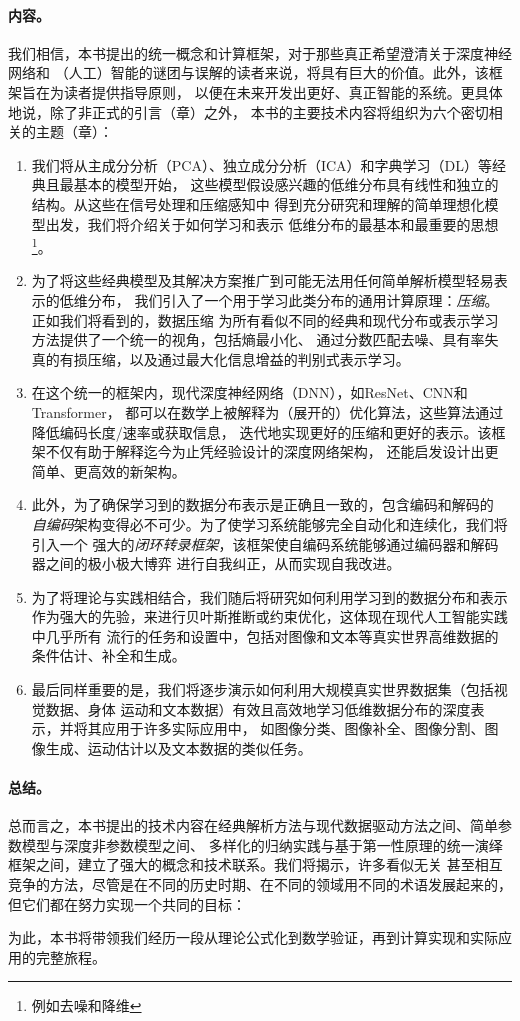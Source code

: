 \documentclass[../../book-main_zh.tex]{subfiles}
\begin{document}
\paragraph{内容。}
我们相信，本书提出的统一概念和计算框架，对于那些真正希望澄清关于深度神经网络和
（人工）智能的谜团与误解的读者来说，将具有巨大的价值。此外，该框架旨在为读者提供指导原则，
以便在未来开发出更好、真正智能的系统。更具体地说，除了非正式的引言（章）之外，
本书的主要技术内容将组织为六个密切相关的主题（章）：
\begin{enumerate}
    \item 我们将从主成分分析（PCA）、独立成分分析（ICA）和字典学习（DL）等经典且最基本的模型开始，
        这些模型假设感兴趣的低维分布具有线性和独立的结构。从这些在信号处理和压缩感知中
        得到充分研究和理解的简单理想化模型出发，我们将介绍关于如何学习和表示
        低维分布的最基本和最重要的思想\footnote{例如去噪和降维}。

    \item 为了将这些经典模型及其解决方案推广到可能无法用任何简单解析模型轻易表示的低维分布，
        我们引入了一个用于学习此类分布的通用计算原理：{\em 压缩}。正如我们将看到的，数据压缩
        为所有看似不同的经典和现代分布或表示学习方法提供了一个统一的视角，包括熵最小化、
        通过分数匹配去噪、具有率失真的有损压缩，以及通过最大化信息增益的判别式表示学习。

    \item 在这个统一的框架内，现代深度神经网络（DNN），如ResNet、CNN和Transformer，
        都可以在数学上被解释为（展开的）优化算法，这些算法通过降低编码长度/速率或获取信息，
        迭代地实现更好的压缩和更好的表示。该框架不仅有助于解释迄今为止凭经验设计的深度网络架构，
        还能启发设计出更简单、更高效的新架构。

    \item 此外，为了确保学习到的数据分布表示是正确且一致的，包含编码和解码的
        {\em 自编码}架构变得必不可少。为了使学习系统能够完全自动化和连续化，我们将引入一个
        强大的{\em 闭环转录框架}，该框架使自编码系统能够通过编码器和解码器之间的极小极大博弈
        进行自我纠正，从而实现自我改进。

    \item 为了将理论与实践相结合，我们随后将研究如何利用学习到的数据分布和表示
        作为强大的先验，来进行贝叶斯推断或约束优化，这体现在现代人工智能实践中几乎所有
        流行的任务和设置中，包括对图像和文本等真实世界高维数据的条件估计、补全和生成。

    \item 最后同样重要的是，我们将逐步演示如何利用大规模真实世界数据集（包括视觉数据、身体
        运动和文本数据）有效且高效地学习低维数据分布的深度表示，并将其应用于许多实际应用中，
        如图像分类、图像补全、图像分割、图像生成、运动估计以及文本数据的类似任务。
\end{enumerate}

\paragraph{总结。}
总而言之，本书提出的技术内容在经典解析方法与现代数据驱动方法之间、简单参数模型与深度非参数模型之间、
多样化的归纳实践与基于第一性原理的统一演绎框架之间，建立了强大的概念和技术联系。我们将揭示，许多看似无关
甚至相互竞争的方法，尽管是在不同的历史时期、在不同的领域用不同的术语发展起来的，但它们都在努力实现一个共同的目标：
\begin{quote}
\end{quote}
为此，本书将带领我们经历一段从理论公式化到数学验证，再到计算实现和实际应用的完整旅程。
\end{document}
